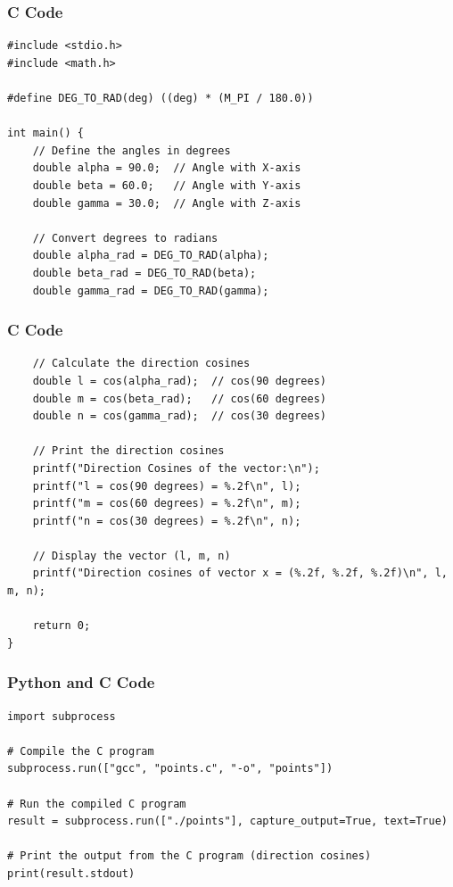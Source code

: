 \documentclass{beamer}
\begin{document}
\begin{frame}[fragile]
\frametitle{C Code}
\begin{lstlisting}
#include <stdio.h>
#include <math.h>

#define DEG_TO_RAD(deg) ((deg) * (M_PI / 180.0))

int main() {
    // Define the angles in degrees
    double alpha = 90.0;  // Angle with X-axis
    double beta = 60.0;   // Angle with Y-axis
    double gamma = 30.0;  // Angle with Z-axis
    
    // Convert degrees to radians
    double alpha_rad = DEG_TO_RAD(alpha);
    double beta_rad = DEG_TO_RAD(beta);
    double gamma_rad = DEG_TO_RAD(gamma);

    \end{lstlisting}

\end{frame}

\begin{frame}[fragile]
\frametitle{C Code}
\begin{lstlisting}
    // Calculate the direction cosines
    double l = cos(alpha_rad);  // cos(90 degrees)
    double m = cos(beta_rad);   // cos(60 degrees)
    double n = cos(gamma_rad);  // cos(30 degrees)

    // Print the direction cosines
    printf("Direction Cosines of the vector:\n");
    printf("l = cos(90 degrees) = %.2f\n", l);
    printf("m = cos(60 degrees) = %.2f\n", m);
    printf("n = cos(30 degrees) = %.2f\n", n);

    // Display the vector (l, m, n)
    printf("Direction cosines of vector x = (%.2f, %.2f, %.2f)\n", l, m, n);

    return 0;
}
\end{lstlisting}
\end{frame}


\begin{frame}[fragile]
\frametitle{Python and C Code}

\begin{lstlisting}
import subprocess

# Compile the C program
subprocess.run(["gcc", "points.c", "-o", "points"])

# Run the compiled C program
result = subprocess.run(["./points"], capture_output=True, text=True)

# Print the output from the C program (direction cosines)
print(result.stdout) 

\end{lstlisting}

\end{frame}

 
\end{document}
